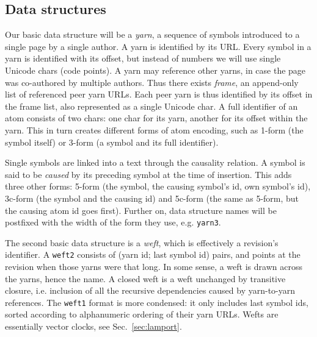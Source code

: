 \documentclass{acm_proc_article-sp}
\begin{document}
\subsection{Data structures}

\newcommand{\aum}{{\fontspec{Devanagari MT}\selectfont ॐ}}
\newcommand{\eoa}{{\fontspec{Geeza Pro}\selectfont ۝}}
\newcommand{\bsp}{{\fontspec{Apple Symbols} ⌫}}
\newcommand{\cnc}{{\fontspec{Apple Symbols} ⌦}}
\newcommand{\zero}{{\fontspec{Apple Symbols} ⌀}}

Our basic data structure will be a \emph{yarn}, a sequence of
symbols introduced to a single page by a single author.
A yarn is identified by its URL.
Every symbol in a yarn is identified with its offset,
but instead of numbers we will use single Unicode chars (code points).
A yarn may reference other yarns, in case the page was
co-authored by multiple authors.
Thus there exists \emph{frame}, an append-only list
of referenced peer yarn URLs. Each peer yarn is thus
identified by its offset in the frame list, also represented as
a single Unicode char. A full identifier of an atom
consists of two chars: one char for its yarn, another
for its offset within the yarn. This in turn creates
different forms of atom encoding, such as 1-form
(the symbol itself) or 3-form (a symbol and its full
identifier).

Single symbols are linked into a text through the causality
relation. A symbol is said to be \emph{caused} by its preceding
symbol at the time of
insertion. This adds three other forms: 5-form (the symbol, the causing
symbol's id, own symbol's id), 3c-form (the symbol and the causing
id) and 5c-form (the same as 5-form, but the causing atom id
goes first).
Further on, data structure names will be postfixed
with the width of the form they use, e.g. {\tt yarn3}.

The second basic data structure is a \emph{weft}, which
is effectively a revision's identifier. A {\tt weft2} consists
of (yarn id; last symbol id) pairs, and points at the
revision when those yarns were that long. 
In some sense, a weft is drawn across the yarns,
hence the name. A closed weft is
a weft unchanged by transitive closure, i.e. inclusion of
all the recursive dependencies caused by yarn-to-yarn
references. The {\tt weft1} format is more condensed:
it only includes last symbol ids, sorted
according to alphanumeric ordering of their yarn URLs.
Wefts are essentially vector clocks,
see Sec.~\ref{sec:lamport}.
\end{document}
